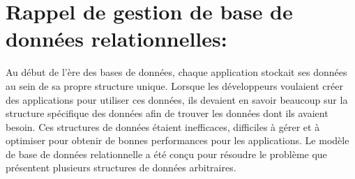 \section{Rappel de gestion de base de données relationnelles:}
Au début de l'ère des bases de données, chaque application stockait ses données au sein de sa propre structure unique. Lorsque les développeurs voulaient créer des applications pour utiliser ces données, ils devaient en savoir beaucoup sur la structure spécifique des données afin de trouver les données dont ils avaient besoin. Ces structures de données étaient inefficaces, difficiles à gérer et à optimiser pour obtenir de bonnes performances pour les applications. Le modèle de base de données relationnelle a été conçu pour résoudre le problème que présentent plusieurs structures de données arbitraires.


\newpage

\newpage

\newpage

\newpage

\newpage